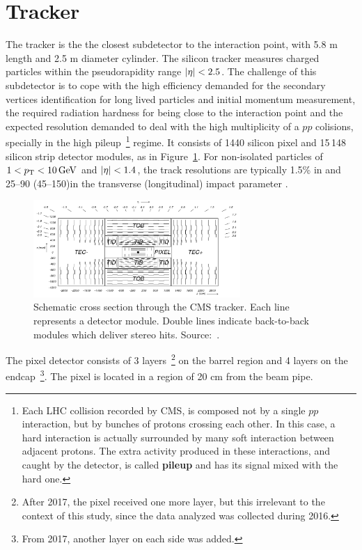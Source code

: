 
\section{Tracker}

The tracker is the the closest subdetector to the interaction point, with 5.8 m length and 2.5 m diameter cylinder. The silicon tracker measures charged particles within the pseudorapidity range $\lvert \eta \rvert < 2.5$. The challenge of this subdetector is to cope with the high efficiency demanded for the secondary vertices identification for long lived particles and initial momentum measurement, the required radiation hardness for being close to the interaction point and the expected resolution demanded to deal with the high multiplicity of a $pp$ colisions, specially in the high pileup~\footnote{Each LHC collision recorded by CMS, is composed not by a single $pp$ interaction, but by bunches of protons crossing each other. In this case, a hard interaction is actually surrounded by many soft interaction between adjacent protons. The extra activity produced in these interactions, and caught by the detector, is called \textbf{pileup} and has its signal mixed with the hard one.} regime. It consists of 1440 silicon pixel and 15\,148 silicon strip detector modules, as in Figure~\ref{cms_tracker}. For non-isolated particles of $1 < p_{\mathrm{T}} < 10\,\text{Ge\hspace{-.08em}V}$ and $\lvert \eta \rvert < 1.4$, the track resolutions are typically 1.5\% in \pt and 25--90 (45--150)\mum in the transverse (longitudinal) impact parameter \cite{TRK-11-001}.

\begin{figure}[htbp]
    \centering
    \includegraphics[width=0.7\textwidth]{figures_and_tables/experimental_setup/tracker.png}
    \caption{ Schematic cross section through the CMS tracker. Each line represents a detector
    module. Double lines indicate back-to-back modules which deliver stereo hits. Source:~\cite{Chatrchyan:2008zzk}.}
    \label{cms_tracker}
\end{figure}

The pixel detector consists of 3 layers~\footnote{After 2017, the pixel received one more layer, but this irrelevant to the context of this study, since the data analyzed was collected during 2016.} on the barrel region and 4 layers on the endcap~\footnote{From 2017, another layer on each side was added.}. The pixel is located in a region of 20 cm from the beam pipe.

